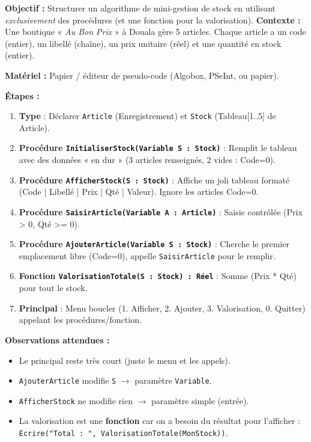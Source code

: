 \documentclass[11pt]{article}
\begin{document}
\begin{experience}
\textbf{Objectif :} Structurer un algorithme de mini-gestion de stock en utilisant \emph{exclusivement} des procédures (et une fonction pour la valorisation).
\textbf{Contexte :} Une boutique « \emph{Au Bon Prix} » à Douala gère 5 articles. Chaque article a un code (entier), un libellé (chaîne), un prix unitaire (réel) et une quantité en stock (entier).

\textbf{Matériel :} Papier / éditeur de pseudo-code (Algobox, PSeInt, ou papier).

\textbf{Étapes :}
\begin{enumerate}
    \item \textbf{Type} : Déclarer \texttt{Article} (Enregistrement) et \texttt{Stock} (Tableau[1..5] de Article).
    \item \textbf{Procédure \texttt{InitialiserStock(Variable S : Stock)}} : Remplit le tableau avec des données « en dur » (3 articles renseignés, 2 vides : Code=0).
    \item \textbf{Procédure \texttt{AfficherStock(S : Stock)}} : Affiche un joli tableau formaté (Code | Libellé | Prix | Qté | Valeur). Ignore les articles Code=0.
    \item \textbf{Procédure \texttt{SaisirArticle(Variable A : Article)}} : Saisie contrôlée (Prix > 0, Qté >= 0).
    \item \textbf{Procédure \texttt{AjouterArticle(Variable S : Stock)}} : Cherche le premier emplacement libre (Code=0), appelle \texttt{SaisirArticle} pour le remplir.
    \item \textbf{Fonction \texttt{ValorisationTotale(S : Stock) : Réel}} : Somme (Prix * Qté) pour tout le stock.
    \item \textbf{Principal} : Menu boucler (1. Afficher, 2. Ajouter, 3. Valorisation, 0. Quitter) appelant les procédures/fonction.
\end{enumerate}

\textbf{Observations attendues :}
\begin{itemize}
    \item Le principal reste très court (juste le menu et les appels).
    \item \texttt{AjouterArticle} modifie \texttt{S} $\rightarrow$ paramètre \texttt{Variable}.
    \item \texttt{AfficherStock} ne modifie rien $\rightarrow$ paramètre simple (entrée).
    \item La valorisation est une \textbf{fonction} car on a besoin du résultat pour l'afficher : \texttt{Ecrire("Total : ", ValorisationTotale(MonStock))}.
\end{itemize}
\end{experience}
\end{document}
